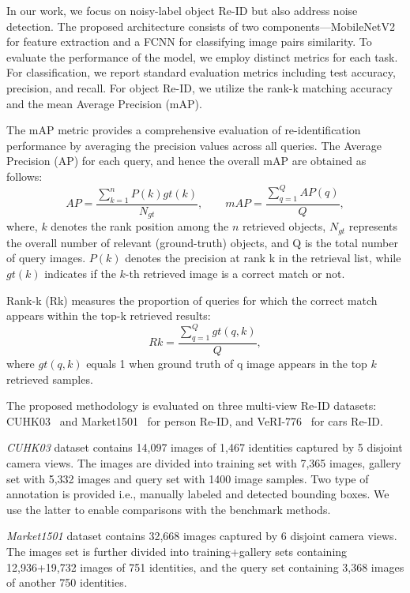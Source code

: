 \documentclass[lettersize,journal]{IEEEtran}
\begin{document}
In our work, we focus on noisy-label object Re-ID but also address noise detection. The proposed architecture consists of two components—MobileNetV2 for feature extraction and a FCNN for classifying image pairs similarity. To evaluate the performance of the model, we employ distinct metrics for each task. For classification, we report standard evaluation metrics including test accuracy, precision, and recall. For object Re-ID, we utilize the rank-k matching accuracy and the mean Average Precision (mAP).

The mAP metric provides a comprehensive evaluation of re-identification performance by averaging the precision values across all queries. The Average Precision (AP) for each query, and hence the overall mAP are obtained as follows:
$$
    AP  = \frac{\sum_{k=1}^{n} P(k) gt(k)}{N_{gt}}, \qquad
    mAP = \frac{\sum_{q=1}^{Q} AP(q)}{Q},
$$
where, $k$ denotes the rank position among the $n$ retrieved objects, $N_{gt}$ represents the overall number of relevant (ground-truth) objects, and Q is the total number of query images. $P(k)$ denotes the precision at rank k in the retrieval list, while $gt(k)$ indicates if the  $k$-th retrieved image is a correct match or not.

Rank-k (Rk) measures the proportion of queries for which the correct match appears within the top-k retrieved results:
$$Rk = \frac{\sum_{q=1}^{Q} gt(q,k)}{Q},$$
where $gt(q,k)$ equals 1 when ground truth of q image appears in the top $k$ retrieved samples.



\vskip 0.15cm
The proposed methodology is evaluated on three multi-view Re-ID datasets: CUHK03~\cite{29} and  Market1501~\cite{30} for person Re-ID, and VeRI-776~\cite{28} for cars Re-ID.

\textit{CUHK03} dataset contains 14,097 images of 1,467 identities captured by 5 disjoint camera views. The images are divided into training set with 7,365 images, gallery set with 5,332 images and query set with 1400 image samples. Two type of annotation is provided i.e., manually labeled and detected bounding boxes. We use the latter to enable comparisons with the benchmark methods.

\textit{Market1501} dataset contains 32,668 images  captured by 6 disjoint camera views. The images set is further divided into training+gallery sets containing 12,936+19,732 images of 751 identities, and the query set containing 3,368 images of another 750 identities.
\end{document}

